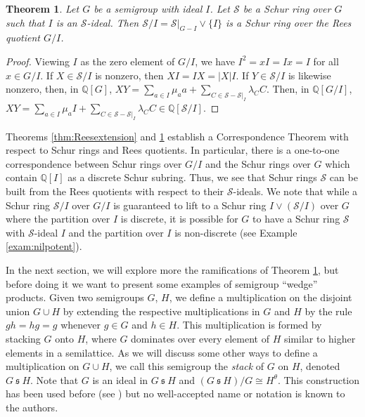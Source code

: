 \documentclass{article}
\theoremstyle{plain}
\newtheorem{Thm}{Theorem}[section]
\theoremstyle{definition}
\newcommand{\thmref}[1]{Theorem \ref{#1}}
\renewcommand{\S}{\mathcal{S}}
\newcommand{\Q}{\mathbb{Q}}
\newcommand{\s}{\ \mathfrak{s}\ }
\begin{document}
\begin{Thm}\label{thm:reesquotient} Let $G$ be a semigroup with ideal $I$. Let $\S$ be a Schur ring over $G$ such that $I$ is an $\S$-ideal. Then $\S/I = \S|_{G-I}\vee \{I\}$ is a Schur ring over the Rees quotient $G/I$.
\end{Thm}
\begin{proof}
 Viewing $I$ as the zero element of $G/I$, we have $I^2 = xI= Ix = I$ for all $x\in G/I$. If $X\in \S/I$ is nonzero, then $XI = IX = |X|I$. If $Y\in \S/I$ is likewise nonzero, then, in $\Q[G]$, $XY = \sum_{a\in I} \mu_aa + \sum_{C\in \S-\S|_I} \lambda_CC$. Then, in $\Q[G/I]$, $XY = \sum_{a\in I}\mu_aI + \sum_{C\in \S-\S|_I} \lambda_CC\in \Q[\S/I]$. 
\end{proof}

Theorems \ref{thm:Reesextension} and \ref{thm:reesquotient} establish a Correspondence Theorem with respect to Schur rings and Rees quotients. In particular, there is a one-to-one correspondence between Schur rings over $G/I$ and the Schur rings over $G$ which contain $\Q[I]$ as a discrete Schur subring. Thus, we see that Schur rings $\S$ can be built from the Rees quotients with respect to their $\S$-ideals. We note that while a Schur ring $\S/I$ over $G/I$ is guaranteed to lift to a Schur ring $I\vee (\S/I)$ over $G$ where the partition over $I$ is discrete, it is possible for $G$ to have a Schur ring $\S$ with $\S$-ideal $I$ and the partition over $I$ is non-discrete (see Example \ref{exam:nilpotent}). 

In the next section, we will explore more the ramifications of \thmref{thm:reesquotient}, but before doing it we want to present some examples of semigroup ``wedge'' products. Given two semigroups $G$, $H$, we define a multiplication on the disjoint union $G\cup H$ by extending the respective multiplications in $G$ and $H$ by the rule $gh = hg = g$ whenever $g\in G$ and $h\in H$. This multiplication is formed by stacking $G$ onto $H$, where $G$ dominates over every element of $H$ similar to higher elements in a semilattice. As we will discuss some other ways to define a multiplication on $G\cup H$,  we call this semigroup the \emph{stack} of $G$ on $H$, denoted \label{stack}$G\s H$. Note that $G$ is an ideal in $G\s H$ and $(G\s H)/G \cong H^\theta$. This construction has been used before (see \cite{Distler}) but no well-accepted name or notation is known to the authors.
\end{document}
